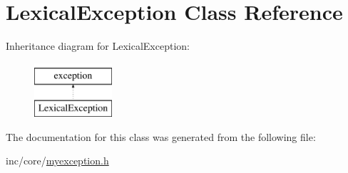 \hypertarget{classLexicalException}{\section{Lexical\-Exception Class Reference}
\label{classLexicalException}
}
Inheritance diagram for Lexical\-Exception\-:\begin{figure}[H]
\begin{center}
\leavevmode
\includegraphics[height=2.000000cm]{classLexicalException}
\end{center}
\end{figure}


The documentation for this class was generated from the following file\-:\begin{DoxyCompactItemize}
\item 
inc/core/\hyperlink{myexception_8h}{myexception.\-h}\end{DoxyCompactItemize}
